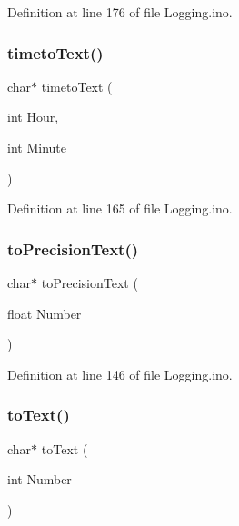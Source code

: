 Definition at line 176 of file Logging.\+ino.

\mbox{\label{_logging_8ino_a6bf81c454bda68dae49607f33a3f8e1d}} 
\subsubsection{\texorpdfstring{timetoText()}{timetoText()}}
{\footnotesize\ttfamily char$\ast$ timeto\+Text (\begin{DoxyParamCaption}\item[{int}]{Hour,  }\item[{int}]{Minute }\end{DoxyParamCaption})}



Definition at line 165 of file Logging.\+ino.

\mbox{\label{_logging_8ino_a4e83915d00c402e1c191e4d344f23e30}} 
\subsubsection{\texorpdfstring{toPrecisionText()}{toPrecisionText()}}
{\footnotesize\ttfamily char$\ast$ to\+Precision\+Text (\begin{DoxyParamCaption}\item[{float}]{Number }\end{DoxyParamCaption})}



Definition at line 146 of file Logging.\+ino.

\mbox{\label{_logging_8ino_a86298138ea32297a21623d770d6674b8}} 
\subsubsection{\texorpdfstring{toText()}{toText()}\hspace{0.1cm}{\footnotesize\ttfamily [1/5]}}
{\footnotesize\ttfamily char$\ast$ to\+Text (\begin{DoxyParamCaption}\item[{int}]{Number }\end{DoxyParamCaption})}



